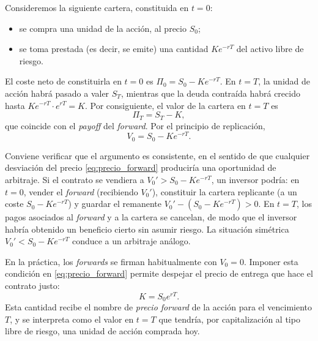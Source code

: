 \documentclass[11pt,a4paper,oneside]{report}
\theoremstyle{plain}
\theoremstyle{definition}
\theoremstyle{remark}
\newcommand{\1}{\mathbf{1}}
\begin{document}
Consideremos la siguiente cartera, constituida en $t = 0$:
\begin{itemize}
  \item se compra una unidad de la acción, al precio $S_0$;
  \item se toma prestada (es decir, se emite) una cantidad $K e^{-rT}$
        del activo libre de riesgo.
\end{itemize}
El coste neto de constituirla en $t = 0$ es $\Pi_0 = S_0 - K e^{-rT}$.
En $t = T$, la unidad de acción habrá pasado a valer $S_T$, mientras
que la deuda contraída habrá crecido hasta $K e^{-rT} \cdot e^{rT} = K$.
Por consiguiente, el valor de la cartera en $t = T$ es
\begin{equation*}
  \Pi_T = S_T - K,
\end{equation*}
que coincide con el \emph{payoff} del \emph{forward}. Por el principio
de replicación,
\begin{equation}\label{eq:precio_forward}
  V_0 = S_0 - K e^{-rT}.
\end{equation}

Conviene verificar que el argumento es consistente, en el sentido de que
cualquier desviación del precio \eqref{eq:precio_forward} produciría una
oportunidad de arbitraje. Si el contrato se vendiera a $V_0' > S_0 - K
e^{-rT}$, un inversor podría: en $t = 0$, vender el \emph{forward}
(recibiendo $V_0'$), constituir la cartera replicante (a un coste $S_0
- K e^{-rT}$) y guardar el remanente $V_0' - (S_0 - K e^{-rT}) > 0$. En
$t = T$, los pagos asociados al \emph{forward} y a la cartera se
cancelan, de modo que el inversor habría obtenido un beneficio cierto
sin asumir riesgo. La situación simétrica $V_0' < S_0 - K e^{-rT}$
conduce a un arbitraje análogo.

En la
práctica, los \emph{forwards} se firman habitualmente con $V_0 = 0$.
Imponer esta condición en \eqref{eq:precio_forward} permite despejar el
precio de entrega que hace el contrato justo:
\begin{equation}\label{eq:precio_forward_just}
  K = S_0 e^{rT}.
\end{equation}
Esta cantidad recibe el nombre de \emph{precio forward} de la acción
para el vencimiento $T$, y se interpreta como el valor en $t = T$ que
tendría, por capitalización al tipo libre de riesgo, una unidad de
acción comprada hoy.
\end{document}
